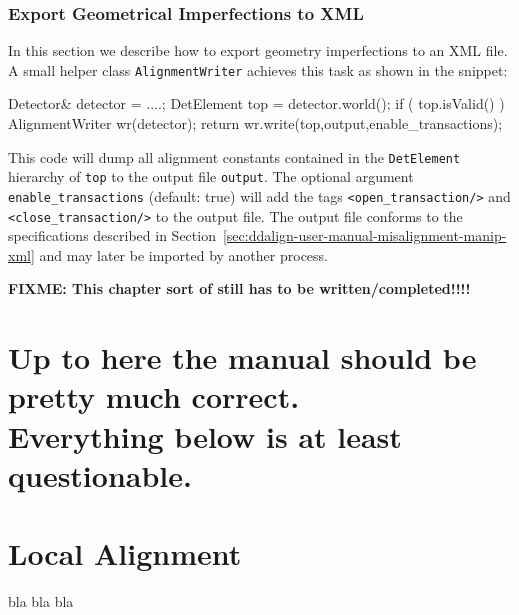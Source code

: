 \documentclass[10pt,a4paper]{article}
\begin{document}
\subsubsection{Export Geometrical Imperfections to XML}
\label{sec:ddalign-user-misalignment-expotr-xml}
\noindent
In this section we describe how to export geometry imperfections to an XML file.
A small helper class {\tt AlignmentWriter} achieves this task as shown in 
the snippet:
\begin{code}
  Detector&  detector = ....;
  DetElement top = detector.world();
  if ( top.isValid() )   {
    AlignmentWriter wr(detector);
    return wr.write(top,output,enable\_transactions);
  }
\end{code}
This code will dump all alignment constants contained in the {\tt DetElement}
hierarchy of {\tt top} to the output file {\tt output}. The optional argument
{\tt enable\_transactions} (default: true) will add the tags 
{\tt <open\_transaction/>} and {\tt <close\_transaction/>} to the output 
file. The output file conforms to the specifications described in 
Section~\ref{sec:ddalign-user-manual-misalignment-manip-xml} and may later
be imported by another process.

\noindent
{\bf{FIXME: This chapter sort of still has to be written/completed!!!!}}

\newpage

\section{Up to here the manual should be pretty much correct.\\
Everything below is at least questionable.}

\section{Local Alignment}
\label{sect:ddalign-local-aligments}
bla bla bla







\end{document}
